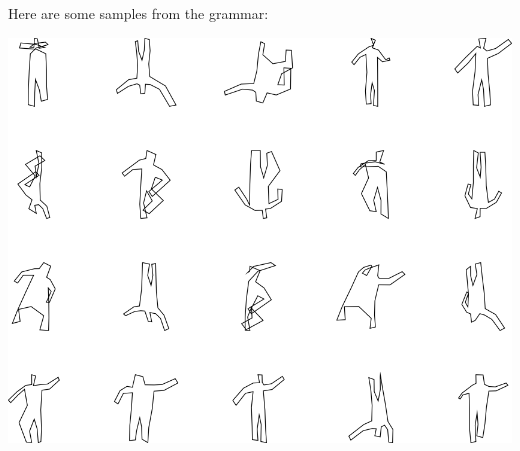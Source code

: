 Here are some samples from the grammar:

\includegraphics[width=6in]{output/3.learning/full_tuning/sdf0_iter20/samples.png}


